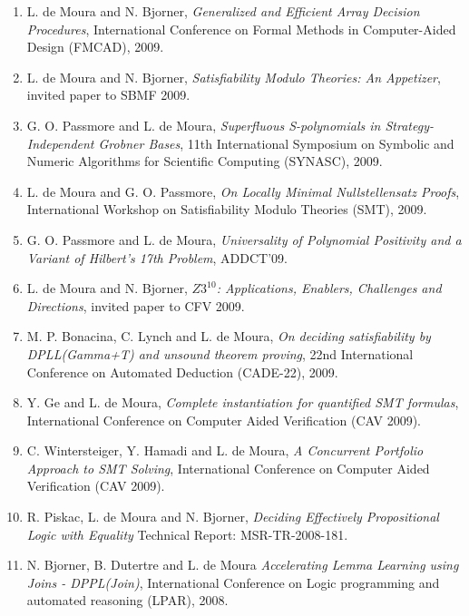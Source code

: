 \documentclass{article}
\begin{document}
\begin{enumerate}
\item L. de Moura and N. Bjorner,
{\em Generalized and Efficient Array Decision Procedures},
International Conference on Formal Methods in Computer-Aided Design (FMCAD), 2009.

\item L. de Moura and N. Bjorner,
{\em Satisfiability Modulo Theories: An Appetizer},
invited paper to SBMF 2009.

\item G. O. Passmore and L. de Moura,
{\em Superfluous S-polynomials in Strategy-Independent Grobner Bases},
11th International Symposium on Symbolic and Numeric Algorithms for Scientific Computing (SYNASC), 2009.

\item L. de Moura and G. O. Passmore,
{\em On Locally Minimal Nullstellensatz Proofs},
International Workshop on Satisfiability Modulo Theories (SMT), 2009.

\item G. O. Passmore and L. de Moura,
{\em Universality of Polynomial Positivity and a Variant of Hilbert's 17th Problem},
ADDCT'09.

\item L. de Moura and N. Bjorner,
{\em $Z3^{10}$: Applications, Enablers, Challenges and Directions},
invited paper to CFV 2009.

\item M. P. Bonacina, C. Lynch and L. de Moura,
{\em On deciding satisfiability by DPLL(Gamma+T) and unsound theorem proving},
22nd International Conference on Automated Deduction (CADE-22), 2009.

\item Y. Ge and L. de Moura,
{\em Complete instantiation for quantified SMT formulas},
International Conference on Computer Aided Verification (CAV 2009).

\item C. Wintersteiger, Y. Hamadi and L. de Moura,
{\em A Concurrent Portfolio Approach to SMT Solving},
International Conference on Computer Aided Verification (CAV 2009).

\item R. Piskac, L. de Moura and N. Bjorner,
{\em Deciding Effectively Propositional Logic with Equality}
Technical Report: MSR-TR-2008-181.

\item N. Bjorner, B. Dutertre and L. de Moura
{\em Accelerating Lemma Learning using Joins - DPPL(Join)},
International Conference on Logic programming and automated reasoning (LPAR), 2008.


\end{enumerate}
\end{document}
